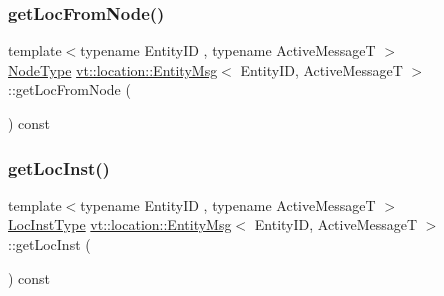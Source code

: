 \mbox{\label{structvt_1_1location_1_1_entity_msg_a38c36e0dd8a9207defaf44458a151d61}} 
\subsubsection{\texorpdfstring{get\+Loc\+From\+Node()}{getLocFromNode()}}
{\footnotesize\ttfamily template$<$typename Entity\+ID , typename Active\+MessageT $>$ \\
\hyperlink{namespacevt_a866da9d0efc19c0a1ce79e9e492f47e2}{Node\+Type} \hyperlink{structvt_1_1location_1_1_entity_msg}{vt\+::location\+::\+Entity\+Msg}$<$ Entity\+ID, Active\+MessageT $>$\+::get\+Loc\+From\+Node (\begin{DoxyParamCaption}{ }\end{DoxyParamCaption}) const\hspace{0.3cm}{\ttfamily [inline]}}

\mbox{\label{structvt_1_1location_1_1_entity_msg_a9393448a6cadfde96c2eab29d28b3e5b}} 
\subsubsection{\texorpdfstring{get\+Loc\+Inst()}{getLocInst()}}
{\footnotesize\ttfamily template$<$typename Entity\+ID , typename Active\+MessageT $>$ \\
\hyperlink{namespacevt_1_1location_a4db6456e8024af2d23fc5ae560fef866}{Loc\+Inst\+Type} \hyperlink{structvt_1_1location_1_1_entity_msg}{vt\+::location\+::\+Entity\+Msg}$<$ Entity\+ID, Active\+MessageT $>$\+::get\+Loc\+Inst (\begin{DoxyParamCaption}{ }\end{DoxyParamCaption}) const\hspace{0.3cm}{\ttfamily [inline]}}

\mbox{\label{structvt_1_1location_1_1_entity_msg_a0796bd63248dae2b457aa2eedc345743}} 
